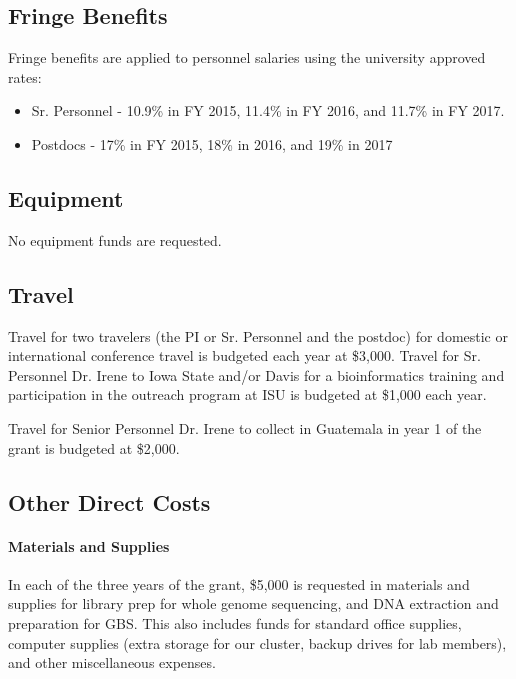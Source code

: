 \documentclass[11pt,letterpaper]{article}
\begin{document}
\subsection*{Fringe Benefits}
Fringe benefits are applied to personnel salaries using the university approved rates:
\begin{itemize}
\item Sr. Personnel - 10.9\% in FY 2015, 11.4\% in FY 2016, and 11.7\% in FY 2017.
\item Postdocs - 17\% in FY 2015, 18\% in 2016, and 19\% in 2017
\end{itemize}

\subsection*{Equipment}

No equipment funds are requested.

\subsection*{Travel}

Travel for two travelers (the PI or Sr. Personnel and the postdoc) for domestic or international conference travel is budgeted each year at \$3,000.  Travel for Sr. Personnel Dr. Irene to Iowa State and/or Davis for a bioinformatics training and participation in the outreach program at ISU is budgeted at \$1,000 each year.

Travel for Senior Personnel Dr. Irene to collect in Guatemala in year 1 of the grant is budgeted at \$2,000.

\subsection*{Other Direct Costs}

 \paragraph{Materials and Supplies}
In each of the three years of the grant, \$5,000 is requested in materials and supplies for library prep for whole genome sequencing, and DNA extraction and preparation for GBS.  This also includes funds for standard office supplies, computer supplies (extra storage for our cluster, backup drives for lab members), and other miscellaneous expenses. 
\end{document}
